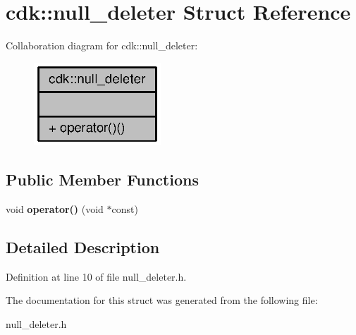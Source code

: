 \section{cdk\+:\+:null\+\_\+deleter Struct Reference}
\label{structcdk_1_1null__deleter}


Collaboration diagram for cdk\+:\+:null\+\_\+deleter\+:
\nopagebreak
\begin{figure}[H]
\begin{center}
\leavevmode
\includegraphics[width=135pt]{structcdk_1_1null__deleter__coll__graph}
\end{center}
\end{figure}
\subsection*{Public Member Functions}
\begin{DoxyCompactItemize}
\item 
void {\bfseries operator()} (void $\ast$const)\label{structcdk_1_1null__deleter_ac230eb90b96a0413d7ca6c99b86c5fa2}

\end{DoxyCompactItemize}


\subsection{Detailed Description}


Definition at line 10 of file null\+\_\+deleter.\+h.



The documentation for this struct was generated from the following file\+:\begin{DoxyCompactItemize}
\item 
null\+\_\+deleter.\+h\end{DoxyCompactItemize}
